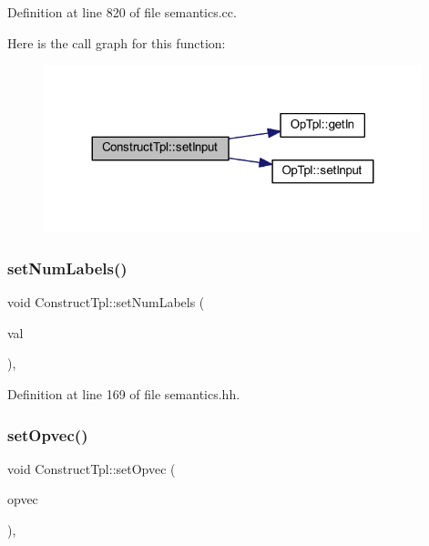 Definition at line 820 of file semantics.\+cc.

Here is the call graph for this function\+:
\nopagebreak
\begin{figure}[H]
\begin{center}
\leavevmode
\includegraphics[width=311pt]{class_construct_tpl_a081103bb58d0e252b4b5b482c49113c6_cgraph}
\end{center}
\end{figure}
\mbox{\label{class_construct_tpl_a23f7a20bd1a914bcc439a79767c2bd6f}} 
\subsubsection{\texorpdfstring{setNumLabels()}{setNumLabels()}}
{\footnotesize\ttfamily void Construct\+Tpl\+::set\+Num\+Labels (\begin{DoxyParamCaption}\item[{uint4}]{val }\end{DoxyParamCaption})\hspace{0.3cm}{\ttfamily [inline]}, {\ttfamily [protected]}}



Definition at line 169 of file semantics.\+hh.

\mbox{\label{class_construct_tpl_afc7e7717c6b970b32c0306c94ecdfeec}} 
\subsubsection{\texorpdfstring{setOpvec()}{setOpvec()}}
{\footnotesize\ttfamily void Construct\+Tpl\+::set\+Opvec (\begin{DoxyParamCaption}\item[{vector$<$ \mbox{\hyperlink{class_op_tpl}{Op\+Tpl}} $\ast$ $>$ \&}]{opvec }\end{DoxyParamCaption})\hspace{0.3cm}{\ttfamily [inline]}, {\ttfamily [protected]}}



